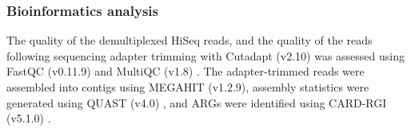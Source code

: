 \subsubsection{Bioinformatics analysis}

The quality of the demultiplexed HiSeq reads, and the quality of the reads following sequencing adapter trimming with Cutadapt (v2.10) was assessed using FastQC (v0.11.9) and MultiQC (v1.8) \parencite{martinCutadaptRemovesAdapter2011, andrewsFastQCQualityControl2010, ewelsMultiQCSummarizeAnalysis2016}.
The adapter-trimmed reads were assembled into contigs using MEGAHIT (v1.2.9), assembly statistics were generated using QUAST (v4.0) \parencite{liMEGAHITUltrafastSinglenode2015, gurevichQUASTQualityAssessment2013}, and ARGs were identified using CARD-RGI (v5.1.0) \parencite{alcockCARD2020Antibiotic2019}.
